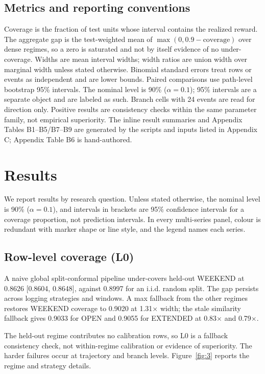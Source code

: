 \subsection{Metrics and reporting conventions}

Coverage is the fraction of test units whose interval contains the realized reward. The aggregate gap is the test-weighted mean of $\max(0,0.9-\text{coverage})$ over dense regimes, so a zero is saturated and not by itself evidence of no under-coverage. Widths are mean interval widths; width ratios are union width over marginal width unless stated otherwise. Binomial standard errors treat rows or events as independent and are lower bounds. Paired comparisons use path-level bootstrap 95\% intervals. The nominal level is 90\% ($\alpha=0.1$); 95\% intervals are a separate object and are labeled as such. Branch cells with 24 events are read for direction only. Positive results are consistency checks within the same parameter family, not empirical superiority. The inline result summaries and Appendix Tables B1--B5/B7--B9 are generated by the scripts and inputs listed in Appendix C; Appendix Table B6 is hand-authored.

\section{Results}\label{sec:results}

We report results by research question. Unless stated otherwise, the nominal level is 90\% ($\alpha=0.1$), and intervals in brackets are 95\% confidence intervals for a coverage proportion, not prediction intervals. In every multi-series panel, colour is redundant with marker shape or line style, and the legend names each series.

\subsection{Row-level coverage (L0)}

A naive global split-conformal pipeline under-covers held-out WEEKEND at 0.8626 [0.8604, 0.8648], against 0.8997 for an i.i.d. random split. The gap persists across logging strategies and windows. A max fallback from the other regimes restores WEEKEND coverage to 0.9020 at 1.31$\times$ width; the stale similarity fallback gives 0.9033 for OPEN and 0.9055 for EXTENDED at 0.83$\times$ and 0.79$\times$.

The held-out regime contributes no calibration rows, so L0 is a fallback consistency check, not within-regime calibration or evidence of superiority. The harder failures occur at trajectory and branch levels. Figure~\ref{fig:3} reports the regime and strategy details.

